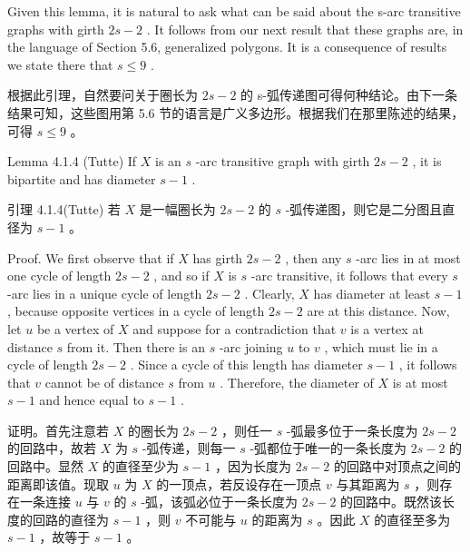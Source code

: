 \documentclass[10pt]{article}
\begin{document}
Given this lemma, it is natural to ask what can be said about the s-arc transitive graphs with girth \({2s} - 2\) . It follows from our next result that these graphs are, in the language of Section 5.6, generalized polygons. It is a consequence of results we state there that \(s \leq  9\) .

\begin{tcolorbox}\relax
根据此引理，自然要问关于圈长为 \({2s} - 2\) 的 s-弧传递图可得何种结论。由下一条结果可知，这些图用第 5.6 节的语言是广义多边形。根据我们在那里陈述的结果，可得 \(s \leq  9\) 。
\end{tcolorbox}

Lemma 4.1.4 (Tutte) If \(X\) is an \(s\) -arc transitive graph with girth \({2s} - 2\) , it is bipartite and has diameter \(s - 1\) .

\begin{tcolorbox}\relax
引理 4.1.4(Tutte) 若 \(X\) 是一幅圈长为 \({2s} - 2\) 的 \(s\) -弧传递图，则它是二分图且直径为 \(s - 1\) 。
\end{tcolorbox}

Proof. We first observe that if \(X\) has girth \({2s} - 2\) , then any \(s\) -arc lies in at most one cycle of length \({2s} - 2\) , and so if \(X\) is \(s\) -arc transitive, it follows that every \(s\) -arc lies in a unique cycle of length \({2s} - 2\) . Clearly, \(X\) has diameter at least \(s - 1\) , because opposite vertices in a cycle of length \({2s} - 2\) are at this distance. Now, let \(u\) be a vertex of \(X\) and suppose for a contradiction that \(v\) is a vertex at distance \(s\) from it. Then there is an \(s\) -arc joining \(u\) to \(v\) , which must lie in a cycle of length \({2s} - 2\) . Since a cycle of this length has diameter \(s - 1\) , it follows that \(v\) cannot be of distance \(s\) from \(u\) . Therefore, the diameter of \(X\) is at most \(s - 1\) and hence equal to \(s - 1\) .

\begin{tcolorbox}\relax
证明。首先注意若 \(X\) 的圈长为 \({2s} - 2\) ，则任一 \(s\) -弧最多位于一条长度为 \({2s} - 2\) 的回路中，故若 \(X\) 为 \(s\) -弧传递，则每一 \(s\) -弧都位于唯一的一条长度为 \({2s} - 2\) 的回路中。显然 \(X\) 的直径至少为 \(s - 1\) ，因为长度为 \({2s} - 2\) 的回路中对顶点之间的距离即该值。现取 \(u\) 为 \(X\) 的一顶点，若反设存在一顶点 \(v\) 与其距离为 \(s\) ，则存在一条连接 \(u\) 与 \(v\) 的 \(s\) -弧，该弧必位于一条长度为 \({2s} - 2\) 的回路中。既然该长度的回路的直径为 \(s - 1\) ，则 \(v\) 不可能与 \(u\) 的距离为 \(s\) 。因此 \(X\) 的直径至多为 \(s - 1\) ，故等于 \(s - 1\) 。
\end{tcolorbox}
\end{document}
